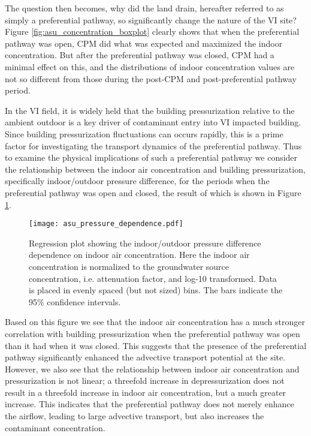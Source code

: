 The question then becomes, why did the land drain, hereafter referred to as simply a preferential pathway, so significantly change the nature of the VI site?
Figure \ref{fig:asu_concentration_boxplot} clearly shows that when the preferential pathway was open, CPM did what was expected and maximized the indoor concentration.
But after the preferential pathway was closed, CPM had a minimal effect on this, and the distributions of indoor concentration values are not so different from those during the post-CPM and post-preferential pathway period.\par

In the VI field, it is widely held that the building pressurization relative to the ambient outdoor is a key driver of contaminant entry into VI impacted building.
Since building pressurization fluctuations can occurs rapidly, this is a prime factor for investigating the transport dynamics of the preferential pathway.
Thus to examine the physical implications of such a preferential pathway we consider the relationship between the indoor air concentration and building pressurization, specifically indoor/outdoor pressure difference, for the periods when the preferential pathway was open and closed, the result of which is shown in Figure \ref{fig:asu_pressure_dependence}.\par

\begin{figure}[htb!]
  \texttt{[image: asu\_pressure\_dependence.pdf]}
  \caption{Regression plot showing the indoor/outdoor pressure difference dependence on indoor air concentration. Here the indoor air concentration is normalized to the groundwater source concentration, i.e. attenuation factor, and log-10 transformed. Data is placed in evenly spaced (but not sized) bins. The bars indicate the 95\% confidence intervals.}
  \label{fig:asu_pressure_dependence}
\end{figure}

Based on this figure we see that the indoor air concentration has a much stronger correlation with building pressurization when the preferential pathway was open than it had when it was closed.
This suggests that the presence of the preferential pathway significantly enhanced the advective transport potential at the site.
However, we also see that the relationship between indoor air concentration and pressurization is not linear; a threefold increase in depressurization does not result in a threefold increase in indoor air concentration, but a much greater increase.
This indicates that the preferential pathway does not merely enhance the airflow, leading to large advective transport, but also increases the contaminant concentration.\par

